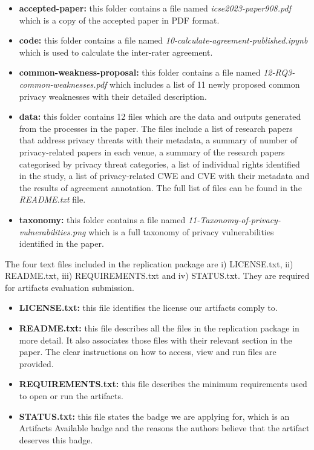 \documentclass{article}
\begin{document}
\begin{itemize}
	\item \textbf{accepted-paper:} this folder contains a file named \emph{icse2023-paper908.pdf} which is a copy of the accepted paper in PDF format.
	
	\item  \textbf{code:} this folder contains a file named \emph{10-calculate-agreement-published.ipynb} which is used to calculate the inter-rater agreement.
	
	\item \textbf{common-weakness-proposal:} this folder contains a file named \emph{12-RQ3-common-weaknesses.pdf} which includes a list of 11 newly proposed common privacy weaknesses with their detailed description.
	
	\item \textbf{data:} this folder contains 12 files which are the data and outputs generated from the processes in the paper. The files include a list of research papers that address privacy threats with their metadata, a summary of number of privacy-related papers in each venue, a summary of the research papers categorised by privacy threat categories, a list of individual rights identified in the study, a list of privacy-related CWE and CVE with their metadata and the results of agreement annotation. The full list of files can be found in the \emph{README.txt} file.
	
	\item \textbf{taxonomy:} this folder contains a file named \emph{11-Taxonomy-of-privacy-vulnerabilities.png} which is a full taxonomy of privacy vulnerabilities identified in the paper.
	
\end{itemize}

The four text files included in the replication package are i) LICENSE.txt, ii) README.txt, iii) REQUIREMENTS.txt and iv) STATUS.txt. They are required for artifacts evaluation submission.

\begin{itemize}
	\item \textbf{LICENSE.txt:} this file identifies the license our artifacts comply to.
	
	\item \textbf{README.txt:} this file describes all the files in the replication package in more detail. It also associates those files with their relevant section in the paper. The clear instructions on how to access, view and run files are provided.
	
	\item \textbf{REQUIREMENTS.txt:} this file describes the minimum requirements used to open or run the artifacts.
	
	\item \textbf{STATUS.txt:} this file states the badge we are applying for, which is an Artifacts Available badge and the reasons the authors believe that the artifact deserves this badge. 
\end{itemize}
\end{document}

